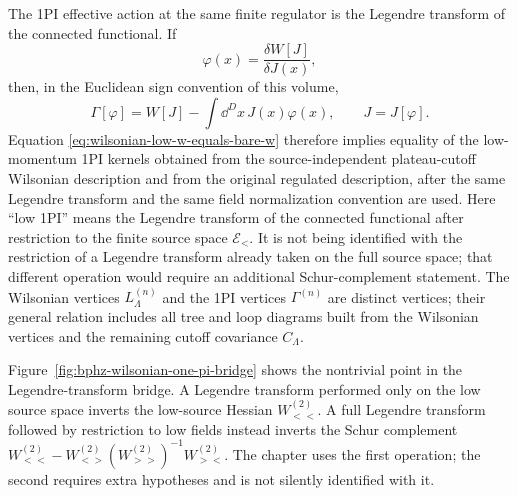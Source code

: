 The 1PI effective action at the same finite regulator is the Legendre
transform of the connected functional.  If
\[
  \varphi(x)=\frac{\delta W[J]}{\delta J(x)},
\]
then, in the Euclidean sign convention of this volume,
\[
  \Gamma[\varphi]
  =
  W[J]-\int\dd^Dx\,J(x)\varphi(x),
  \qquad
  J=J[\varphi].
\]
Equation \eqref{eq:wilsonian-low-w-equals-bare-w} therefore implies equality
of the low-momentum 1PI kernels obtained from the source-independent
plateau-cutoff Wilsonian description and from the original regulated
description, after the same Legendre transform and the same field
normalization convention are used.  Here ``low 1PI'' means the Legendre
transform of the connected functional after restriction to the finite source
space \(\mathcal E_<\).  It is not being identified with the restriction of a
Legendre transform already taken on the full source space; that different
operation would require an additional Schur-complement statement.  The
Wilsonian vertices
\(L_\Lambda^{(n)}\) and the 1PI vertices \(\Gamma^{(n)}\) are distinct
vertices; their general relation includes all tree and loop diagrams built
from the Wilsonian vertices and the remaining cutoff covariance \(C_\Lambda\).

Figure~\ref{fig:bphz-wilsonian-one-pi-bridge} shows the nontrivial point in the
Legendre-transform bridge.  A Legendre transform performed only on the low
source space inverts the low-source Hessian \(W_{<<}^{(2)}\).  A full Legendre
transform followed by restriction to low fields instead inverts the Schur
complement \(W_{<<}^{(2)}-W_{<>}^{(2)}(W_{>>}^{(2)})^{-1}W_{><}^{(2)}\).  The
chapter uses the first operation; the second requires extra hypotheses and is
not silently identified with it.


